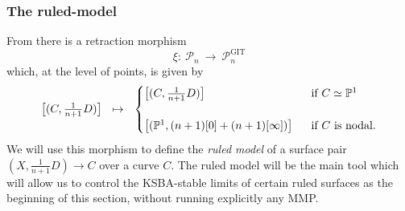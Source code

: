 \documentclass[a4paper,12pt]{amsart}
\DeclareMathOperator{\GIT}{GIT}
\newcommand{\bP}{{\mathbb P}}
\newcommand{\sP}{{\mathscr{P}}}
\theoremstyle{definition}
\theoremstyle{remark}
\begin{document}
\subsubsection{The ruled-model}
From  there is a retraction morphism $$\xi\colon \ \sP_n\ \longrightarrow \  \sP_n^{\GIT}$$ which, at the level of points, is given by $$\textstyle \big[(C,\frac{1}{n+1}D)\big]\ \ \mapsto \ \ \begin{cases}
    \big[(C,\frac{1}{n+1}D)\big] \ \  
 & \textup{if }C\simeq \bP^1 \\
     &  \\
    \big[(\bP^1,(n+1)[0] + (n+1)[\infty])\big] \ \  & \textup{if }C\textup{ is nodal}.
\end{cases}$$ We will use this morphism to define the \textit{ruled model} of a surface pair $(X,\frac{1}{n+1}D)\to C$ over a curve $C$. The ruled model will be the main tool which will allow us to control the KSBA-stable limits of certain ruled surfaces as the beginning of this section, without running explicitly any MMP.
\end{document}

